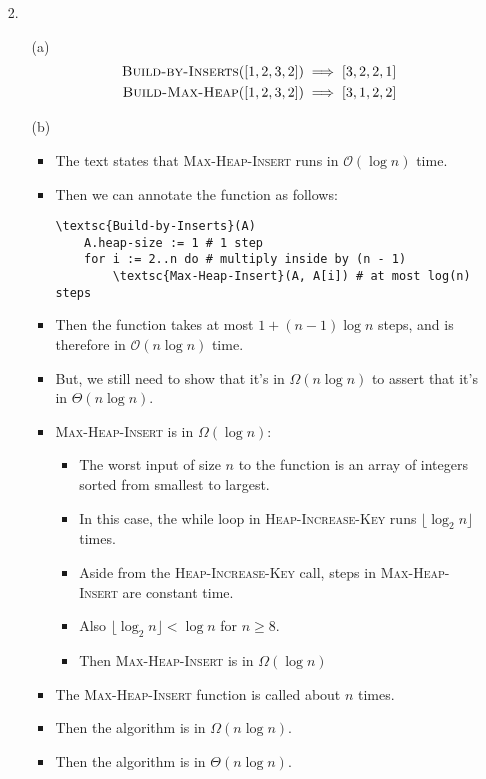 \documentclass{article}
\begin{document}
\begin{enumerate}
\item [2.]
    \begin{enumerate}
    \item [(a)]
        \begin{equation*}
        \begin{aligned}
            \textsc{Build-by-Inserts}([1, 2, 3, 2]) & \implies [3, 2, 2, 1] \\
            \textsc{Build-Max-Heap}([1, 2, 3, 2]) & \implies [3, 1, 2, 2]
        \end{aligned}
        \end{equation*}
    \item [(b)]
        \begin{itemize}
        \item The text states that \textsc{Max-Heap-Insert} runs in $\mathcal{O}(\log n)$ time.
        \item Then we can annotate the function as follows:
            \begin{lstlisting}
\textsc{Build-by-Inserts}(A)
    A.heap-size := 1 # 1 step
    for i := 2..n do # multiply inside by (n - 1)
        \textsc{Max-Heap-Insert}(A, A[i]) # at most log(n) steps
            \end{lstlisting}
        \item Then the function takes at most $1 + (n - 1) \log n$ steps, and is therefore in $\mathcal{O}(n \log n)$ time.
        \item But, we still need to show that it's in $\Omega(n \log n)$ to assert that it's in $\Theta(n \log n)$.
        \item \textsc{Max-Heap-Insert} is in $\Omega(\log n)$:
            \begin{itemize}
            \item The worst input of size $n$ to the function is an array of integers sorted from smallest to largest.
            \item In this case, the while loop in \textsc{Heap-Increase-Key} runs $\lfloor \log_2 n \rfloor$ times.
            \item Aside from the \textsc{Heap-Increase-Key} call, steps in \textsc{Max-Heap-Insert} are constant time.
            \item Also $\lfloor \log_2 n \rfloor < \log n$ for $n \geq 8$.
            \item Then \textsc{Max-Heap-Insert} is in $\Omega(\log n)$
            \end{itemize}
        \item The \textsc{Max-Heap-Insert} function is called about $n$ times.
        \item Then the algorithm is in $\Omega(n \log n)$.
        \item Then the algorithm is in $\Theta(n \log n)$.
        \end{itemize}
    \end{enumerate}
\end{enumerate}
\end{document}
